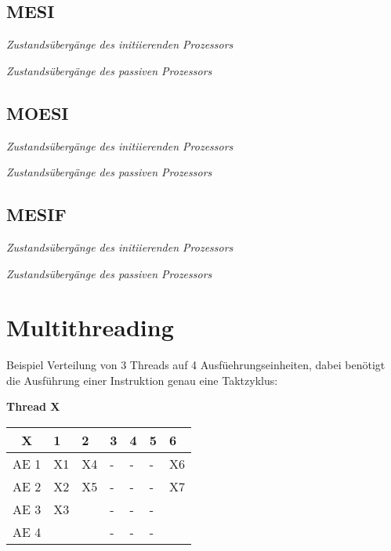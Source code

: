 \documentclass
[
	8pt,		%
	ngerman,	%
	a4paper,	%
	landscape,	%
	final		%
]{extarticle}
\begin{document}
\begin{multicols*}{4}
\subsection{MESI}
\begin{center}
	
	{\small\textit{Zustandsübergänge des initiierenden Prozessors}}
	
	{\small\textit{Zustandsübergänge des passiven Prozessors}}
\end{center}
\subsection{MOESI}
\begin{center}
	
	{\small\textit{Zustandsübergänge des initiierenden Prozessors}}
	
	{\small\textit{Zustandsübergänge des passiven Prozessors}}
\end{center}
\subsection{MESIF}
\begin{center}
	
	{\small\textit{Zustandsübergänge des initiierenden Prozessors}}
	
	{\small\textit{Zustandsübergänge des passiven Prozessors}}
\end{center}
\columnbreak
\section{Multithreading}
Beispiel Verteilung von 3 Threads auf 4 Ausfüehrungseinheiten, dabei
benötigt die Ausführung einer Instruktion genau eine Taktzyklus:
\par\vspace{\abovedisplayskip}

\textbf{Thread X}\par\vspace{\abovedisplayskip}
\begin{tabularx}{\linewidth}{|c|XXXXXX|}\hline
	X    & 1  & 2  & 3 & 4 & 5 & 6  \\\hline
	AE 1 & X1 & X4 & - & - & - & X6 \\
	AE 2 & X2 & X5 & - & - & - & X7 \\
	AE 3 & X3 &    & - & - & - &    \\
	AE 4 &    &    & - & - & - &    \\\hline
\end{tabularx}\par\vspace{\belowdisplayskip}


\end{multicols*}
\end{document}
